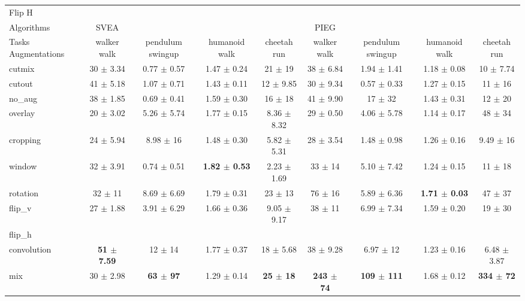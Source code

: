 \begin{tabular}{lcccccccc}
Flip H & & & & & & & & \\
Algorithms & SVEA & & & & PIEG & & & \\
Tasks Augmentations & walker walk & pendulum swingup & humanoid walk & cheetah run & walker walk & pendulum swingup & humanoid walk & cheetah run \\
cutmix          & 30 $\pm$ 3.34 & 0.77 $\pm$ 0.57 & 1.47 $\pm$ 0.24 & 21 $\pm$ 19 & 38 $\pm$ 6.84 & 1.94 $\pm$ 1.41 & 1.18 $\pm$ 0.08 & 10 $\pm$ 7.74 \\
cutout          & 41 $\pm$ 5.18 & 1.07 $\pm$ 0.71 & 1.43 $\pm$ 0.11 & 12 $\pm$ 9.85 & 30 $\pm$ 9.34 & 0.57 $\pm$ 0.33 & 1.27 $\pm$ 0.15 & 11 $\pm$ 16 \\
no\_aug         & 38 $\pm$ 1.85 & 0.69 $\pm$ 0.41 & 1.59 $\pm$ 0.30 & 16 $\pm$ 18 & 41 $\pm$ 9.90 & 17 $\pm$ 32 & 1.43 $\pm$ 0.31 & 12 $\pm$ 20 \\
overlay         & 20 $\pm$ 3.02 & 5.26 $\pm$ 5.74 & 1.77 $\pm$ 0.15 & 8.36 $\pm$ 8.32 & 29 $\pm$ 0.50 & 4.06 $\pm$ 5.78 & 1.14 $\pm$ 0.17 & 48 $\pm$ 34 \\
cropping        & 24 $\pm$ 5.94 & 8.98 $\pm$ 16 & 1.48 $\pm$ 0.30 & 5.82 $\pm$ 5.31 & 28 $\pm$ 3.54 & 1.48 $\pm$ 0.98 & 1.26 $\pm$ 0.16 & 9.49 $\pm$ 16 \\
window          & 32 $\pm$ 3.91 & 0.74 $\pm$ 0.51 & \textbf{1.82 $\pm$ 0.53} & 2.23 $\pm$ 1.69 & 33 $\pm$ 14 & 5.10 $\pm$ 7.42 & 1.24 $\pm$ 0.15 & 11 $\pm$ 18 \\
rotation        & 32 $\pm$ 11 & 8.69 $\pm$ 6.69 & 1.79 $\pm$ 0.31 & 23 $\pm$ 13 & 76 $\pm$ 16 & 5.89 $\pm$ 6.36 & \textbf{1.71 $\pm$ 0.03} & 47 $\pm$ 37 \\
flip\_v         & 27 $\pm$ 1.88 & 3.91 $\pm$ 6.29 & 1.66 $\pm$ 0.36 & 9.05 $\pm$ 9.17 & 38 $\pm$ 11 & 6.99 $\pm$ 7.34 & 1.59 $\pm$ 0.20 & 19 $\pm$ 30 \\
flip\_h         &  &  &  &  &  &  &  &  \\
convolution     & \textbf{51 $\pm$ 7.59} & 12 $\pm$ 14 & 1.77 $\pm$ 0.37 & 18 $\pm$ 5.68 & 38 $\pm$ 9.28 & 6.97 $\pm$ 12 & 1.23 $\pm$ 0.16 & 6.48 $\pm$ 3.87 \\
mix             & 30 $\pm$ 2.98 & \textbf{63 $\pm$ 97} & 1.29 $\pm$ 0.14 & \textbf{25 $\pm$ 18} & \textbf{243 $\pm$ 74} & \textbf{109 $\pm$ 111} & 1.68 $\pm$ 0.12 & \textbf{334 $\pm$ 72} \\
\end{tabular}